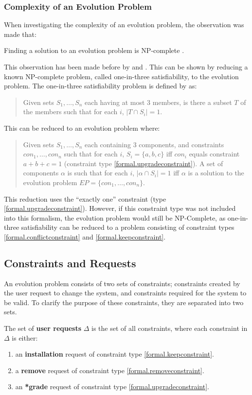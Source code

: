 \subsubsection{Complexity of an Evolution Problem}
When investigating the complexity of an evolution problem, the observation was made that:
\begin{obs}
Finding a solution to an evolution problem is NP-complete \citep{cook1971}.
\end{obs}
This observation has been made before by \cite{Mancinelli2006} and \cite{abate2011}.
This can be shown by reducing a known NP-complete problem, called one-in-three satisfiability, to the evolution problem.
The one-in-three satisfiability problem is defined by \cite{Schaefer1978} as:
\begin{quote}
Given sets $S_1, \ldots, S_n$ each having at most 3 members, is there a subset $T$ of the members such that for each $i$, $|T \cap S_i|  =  1$.
\end{quote}

This can be reduced to an evolution problem where:
\begin{quote}
Given sets $S_1, \ldots, S_n$ each containing 3 components, and constraints $con_1,\ldots,con_n$
such that for each $i$, $S_i = \{a,b,c\}$ iff $con_i$ equals constraint $a + b + c = 1$ (constraint type \ref{formal.upgradeconstraint}).
A set of components $\alpha$ is such that for each $i$, $|\alpha \cap S_i|  =  1$ iff $\alpha$ is a solution to the evolution problem $EP = \{con_1,\ldots,con_n\}$.
\end{quote}

This reduction uses the ``exactly one'' constraint (type \ref{formal.upgradeconstraint}).
However, if this constraint type was not included into this formalism, the evolution problem would still be NP-Complete,
as one-in-three satisfiability can be reduced to a problem consisting of  constraint types \ref{formal.conflictconstraint} and \ref{formal.keepconstraint}.

\subsection{Constraints and Requests}
\label{formal.constraints}
An evolution problem consists of two sets of constraints; constraints created by the user request to change the system, 
and constraints required for the system to be valid.
To clarify the purpose of these constraints, they are separated into two sets.

\begin{defs}
The set of \textbf{user requests} $\Delta$ is the set of all constraints, where each constraint in $\Delta$ is either:
\begin{enumerate}
  \item an \textbf{installation} request of constraint type \ref{formal.keepconstraint}.
  \item a \textbf{remove} request of constraint type \ref{formal.removeconstraint}.
  \item an \textbf{*grade} request of constraint type \ref{formal.upgradeconstraint}.
\end{enumerate}
\end{defs}

